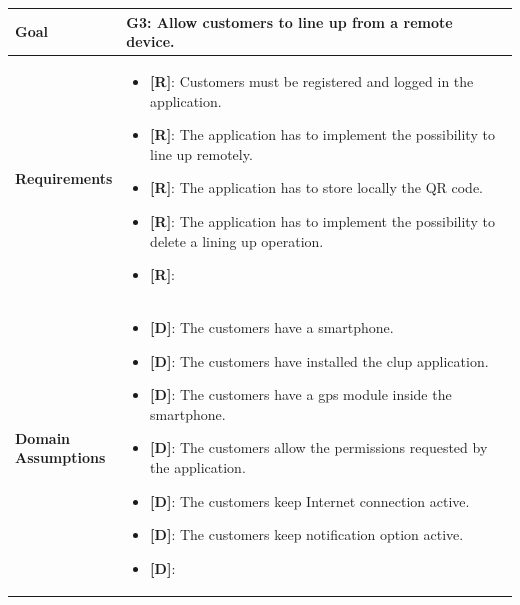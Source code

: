 \begin{table}[H]
\centering
\begin{tabular}{| m{} | m{} |} 
	\hline
	\textbf{Goal} &
		\textbf{G3: Allow customers to line up from a remote device.} \\
	\hline
	\textbf{Requirements} &
		\begin{itemize}
			\item {\textbf{[R]}}: Customers must be registered and logged in the application.
			\item {\textbf{[R]}}: The application has to implement the possibility to line up remotely.
			\item {\textbf{[R]}}: The application has to store locally the QR code.
			\item {\textbf{[R]}}: The application has to implement the possibility to delete a lining up operation.
			\item {\textbf{[R]}}:
		\end{itemize} \\ 
	\hline
	\shortstack[l]{\textbf{Domain} \\ \textbf{Assumptions}} & 
		\begin{itemize}
			\item {\textbf{[D]}}: The customers have a smartphone.
			\item {\textbf{[D]}}: The customers have installed the \gls{clup} application.
			\item {\textbf{[D]}}: The customers have a \gls{gps} module inside the smartphone.
			\item {\textbf{[D]}}: The customers allow the permissions requested by the application.
			\item {\textbf{[D]}}: The customers keep Internet connection active.
			\item {\textbf{[D]}}: The customers keep notification option active.
			\item {\textbf{[D]}}:
		\end{itemize} \\ 
	\hline
\end{tabular}
\end{table}

